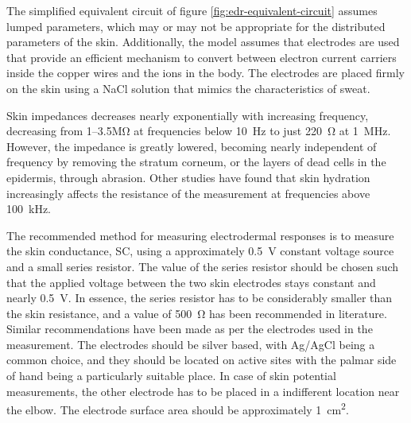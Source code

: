 \documentclass[a4paper,11pt]{article}
\begin{document}
The simplified equivalent circuit of figure
\ref{fig:edr-equivalent-circuit} assumes lumped parameters, which may
or may not be appropriate for the distributed parameters of the
skin. Additionally, the model assumes that electrodes are used that
provide an efficient mechanism to convert between electron current
carriers inside the copper wires and the ions in the body. The
electrodes are placed firmly on the skin using a NaCl solution that
mimics the characteristics of sweat\cite{Malmivuo1995}.

Skin impedances decreases nearly exponentially with increasing
frequency, decreasing from \numrange{1}{3.5}\si{\mega\ohm} at
frequencies below \SI{10}{\hertz} to just \SI{220}{\ohm} at
\SI{1}{\mega\hertz}. However, the impedance is greatly lowered,
becoming nearly independent of frequency by removing the stratum
corneum, or the layers of dead cells in the epidermis, through
abrasion.\cite{Rosell1988} Other studies have found that skin
hydration increasingly affects the resistance of the measurement at
frequencies above \SI{100}{\kilo\hertz}\cite{Yamamoto1986}.

The recommended method for measuring electrodermal responses is to
measure the skin conductance, SC, using a approximately
\SI{0.5}{\volt} constant voltage source and a small series
resistor. The value of the series resistor should be chosen such that
the applied voltage between the two skin electrodes stays constant and
nearly \SI{0.5}{\volt}. In essence, the series resistor has to be
considerably smaller than the skin resistance, and a value of
\SI{500}{\ohm} has been recommended in literature.  Similar
recommendations have been made as per the electrodes used in the
measurement. The electrodes should be silver based, with Ag/AgCl being
a common choice, and they should be located on active sites with the
palmar side of hand being a particularly suitable place. In case of
skin potential measurements, the other electrode has to be placed in a
indifferent location near the elbow. The electrode surface area should
be approximately
\SI{1}{\cm^2}.\cite{Fowles1981,Rosell1988,Yamamoto1986,Malmivuo1995}
\end{document}
